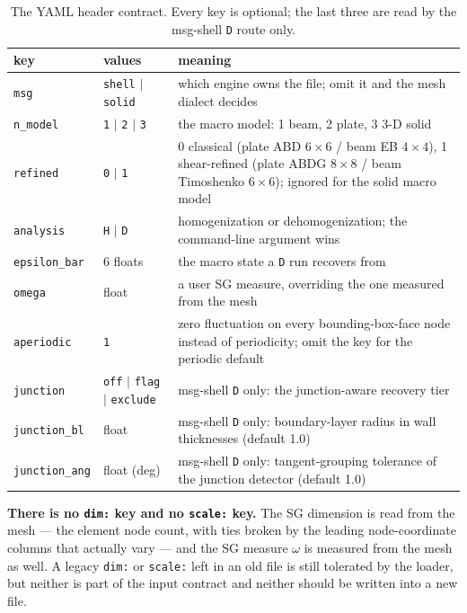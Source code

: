 \begin{table}[htbp]
\centering
\small
\caption{The YAML header contract. Every key is optional; the last three are
read by the msg-shell \texttt{D} route only.}
\label{tab:input-header-keys}
\begin{tabular}{@{}llp{7.3cm}@{}}
\toprule
key & values & meaning \\
\midrule
\texttt{msg} & \texttt{shell} $|$ \texttt{solid}
  & which engine owns the file; omit it and the mesh dialect decides \\
\texttt{n\_model} & \texttt{1} $|$ \texttt{2} $|$ \texttt{3}
  & the macro model: 1 beam, 2 plate, 3 3-D solid \\
\texttt{refined} & \texttt{0} $|$ \texttt{1}
  & 0 classical (plate ABD $6\times6$ / beam EB $4\times4$), 1 shear-refined
    (plate ABDG $8\times8$ / beam Timoshenko $6\times6$); ignored for the
    solid macro model \\
\texttt{analysis} & \texttt{H} $|$ \texttt{D}
  & homogenization or dehomogenization; the command-line argument wins \\
\texttt{epsilon\_bar} & 6 floats & the macro state a \texttt{D} run recovers from \\
\texttt{omega} & float
  & a user SG measure, overriding the one measured from the mesh \\
\texttt{aperiodic} & \texttt{1}
  & zero fluctuation on every bounding-box-face node instead of periodicity;
    omit the key for the periodic default \\
\texttt{junction} & \texttt{off} $|$ \texttt{flag} $|$ \texttt{exclude}
  & msg-shell \texttt{D} only: the junction-aware recovery tier \\
\texttt{junction\_bl} & float
  & msg-shell \texttt{D} only: boundary-layer radius in wall thicknesses
    (default 1.0) \\
\texttt{junction\_ang} & float (deg)
  & msg-shell \texttt{D} only: tangent-grouping tolerance of the junction
    detector (default 1.0) \\
\bottomrule
\end{tabular}
\end{table}

\noindent
\textbf{There is no \texttt{dim:} key and no \texttt{scale:} key.} The SG
dimension is read from the mesh --- the element node count, with ties broken
by the leading node-coordinate columns that actually vary --- and the SG
measure $\omega$ is measured from the mesh as well. A legacy \texttt{dim:} or
\texttt{scale:} left in an old file is still tolerated by the loader, but
neither is part of the input contract and neither should be written into a new
file.

